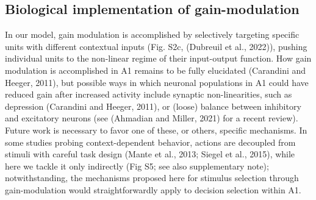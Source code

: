 \documentclass[12pt]{article}
\begin{document}
\subsection*{Biological implementation of gain-modulation}
In our model, gain modulation is accomplished by selectively targeting specific units with different contextual inputs (Fig. S2c, (Dubreuil et al., 2022)), pushing individual units to the non-linear regime of their input-output function. How gain modulation is accomplished in A1 remains to be fully elucidated (Carandini and Heeger, 2011), but possible ways in which neuronal populations in A1 could have reduced gain after increased activity include synaptic non-linearities, such as depression (Carandini and Heeger, 2011), or (loose) balance between inhibitory and excitatory neurons (see (Ahmadian and Miller, 2021) for a recent review). Future work is necessary to favor one of these, or others, specific mechanisms. In some studies probing context-dependent behavior, actions are decoupled from stimuli with careful task design (Mante et al., 2013; Siegel et al., 2015), while here we tackle it only indirectly (Fig S5; see also supplementary note); notwithstanding, the mechanisms proposed here for stimulus selection through gain-modulation would straightforwardly apply to decision selection within A1. 
\end{document}
